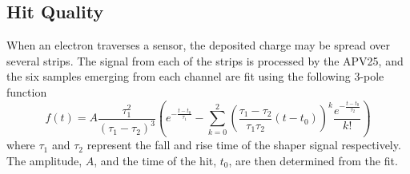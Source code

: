 \subsection{Hit Quality}

When an electron traverses a sensor, the deposited charge may be spread over
several strips.  The signal from each of the strips is processed by the
APV25, and the six samples emerging from each channel are fit using the 
following 3-pole function
\begin{equation}
    f(t) = A\frac{\tau_1^2}{(\tau_1 - \tau_2)^3}\left( e^{-\frac{t-t_{0}}{\tau_1}}
        - \sum_{k=0}^2 \left(\frac{\tau_1 - \tau_2}{\tau_1\tau_2}(t-t_{0})\right)^k
        \frac{e^{-\frac{t-t_{0}}{\tau_2}}}{k!} \right)
\end{equation}
where $\tau_1$ and $\tau_2$ represent the fall and rise time of the shaper 
signal respectively.  The amplitude, $A$, and the time of the hit, $t_0$, are then
determined from the fit.

